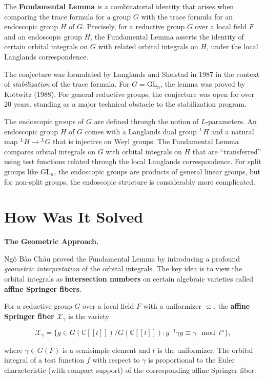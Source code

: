 The \textbf{Fundamental Lemma} is a combinatorial identity that arises when comparing the trace formula for a group $G$ with the trace formula for an endoscopic group $H$ of $G$. Precisely, for a reductive group $G$ over a local field $F$ and an endoscopic group $H$, the Fundamental Lemma asserts the identity of certain orbital integrals on $G$ with related orbital integrals on $H$, under the local Langlands correspondence.

The conjecture was formulated by Langlands and Shelstad in 1987 in the context of \emph{stabilization} of the trace formula. For $G = \text{GL}_n$, the lemma was proved by Kottwitz (1988). For general reductive groups, the conjecture was open for over 20 years, standing as a major technical obstacle to the stabilization program.

The endoscopic groups of $G$ are defined through the notion of $L$-parameters. An endoscopic group $H$ of $G$ comes with a Langlands dual group ${}^L H$ and a natural map ${}^L H \to {}^L G$ that is injective on Weyl groups. The Fundamental Lemma compares orbital integrals on $G$ with orbital integrals on $H$ that are ``transferred'' using test functions related through the local Langlands correspondence. For split groups like $\text{GL}_n$, the endoscopic groups are products of general linear groups, but for non-split groups, the endoscopic structure is considerably more complicated.

\section{How Was It Solved}\label{ch2010ngobaochau:how-was-it-solved}

\textbf{The Geometric Approach.}

Ngô Bào Châu proved the Fundamental Lemma by introducing a profound \emph{geometric interpretation} of the orbital integrals. The key idea is to view the orbital integrals as \textbf{intersection numbers} on certain algebraic varieties called \textbf{affine Springer fibers}.

For a reductive group $G$ over a local field $F$ with a uniformizer $\varpi$, the \textbf{affine Springer fiber} $\mathcal{X}_\gamma$ is the variety

\[
\mathcal{X}_\gamma = \{ g \in G(\mathbb{C}[[t]]) / G(\mathbb{C}[[t]]) : g^{-1} \gamma g \equiv \gamma \mod t^n \},
\]

where $\gamma \in G(F)$ is a semisimple element and $t$ is the uniformizer. The orbital integral of a test function $f$ with respect to $\gamma$ is proportional to the Euler characteristic (with compact support) of the corresponding affine Springer fiber:

